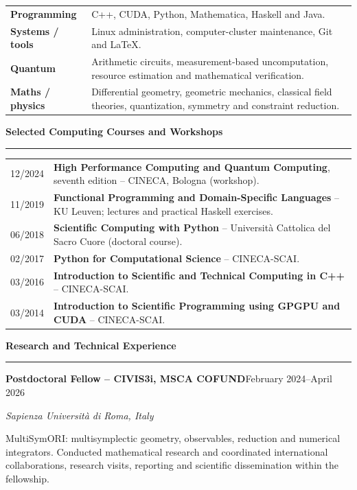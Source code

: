 \documentclass[10pt,a4paper]{article}
\newcommand{\cvsection}[1]{%
    \Needspace{4\baselineskip}%
    \vspace{0.8em}%
    {\large\bfseries\color{accent} #1}\par
    \vspace{0.2em}\hrule\vspace{0.45em}%
}
\newcommand{\entry}[4]{%
    \Needspace{4\baselineskip}%
    \textbf{#1}\hfill #2\par
    \textit{#3}\par
    #4\par\vspace{0.45em}%
}
\begin{document}
    \begin{tabularx}{\textwidth}{%
        @{}>{\raggedright\arraybackslash\bfseries}p{2.8cm}%
        >{\raggedright\arraybackslash}X@{}%
    }
        Programming &
            C++, CUDA, Python, Mathematica, Haskell and Java. \\[3pt]
        Systems / tools &
            Linux administration, computer-cluster maintenance, Git and \LaTeX. \\[3pt]
        Quantum &
            Arithmetic circuits, measurement-based uncomputation,
            resource estimation and mathematical verification. \\[3pt]
        Maths / physics &
            Differential geometry, geometric mechanics, classical field
            theories, quantization, symmetry and constraint reduction.
    \end{tabularx}

    \newpage

    \cvsection{Selected Computing Courses and Workshops}

    \begin{tabularx}{\textwidth}{@{}p{1.3cm}X@{}}
        12/2024 & \textbf{High Performance Computing and Quantum Computing},
            seventh edition -- CINECA, Bologna (workshop). \\[4pt]
        11/2019 & \textbf{Functional Programming and Domain-Specific Languages}
            -- KU Leuven; lectures and practical Haskell exercises. \\[4pt]
        06/2018 & \textbf{Scientific Computing with Python}
            -- Universit\`a Cattolica del Sacro Cuore (doctoral course). \\[4pt]
        02/2017 & \textbf{Python for Computational Science}
            -- CINECA-SCAI. \\[4pt]
        03/2016 & \textbf{Introduction to Scientific and Technical Computing in C++}
            -- CINECA-SCAI. \\[4pt]
        03/2014 & \textbf{Introduction to Scientific Programming using GPGPU and CUDA}
            -- CINECA-SCAI.
    \end{tabularx}

    \cvsection{Research and Technical Experience}

    \entry{Postdoctoral Fellow -- CIVIS3i, MSCA COFUND}{February 2024--April 2026}
        {Sapienza Universit\`a di Roma, Italy}
        {MultiSymORI: multisymplectic geometry, observables, reduction and
        numerical integrators. Conducted mathematical research and coordinated
        international collaborations, research visits, reporting and scientific
        dissemination within the fellowship.}
\end{document}
